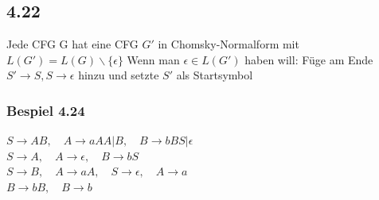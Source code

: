 \documentclass[11pt]{article}
\begin{document}
\subsection{4.22}
\label{sec:org444fd62}
Jede CFG G hat eine CFG \(G'\) in Chomsky-Normalform mit \(L(G') = L(G) \backslash \{\epsilon\}\)
Wenn man \(\epsilon \in L(G')\) haben will: Füge am Ende \(S' \rightarrow S, S\rightarrow \epsilon\) hinzu und setzte \(S'\) als Startsymbol

\subsubsection{Bespiel 4.24}
\label{sec:org7d94006}
\(S \rightarrow AB,\quad A \rightarrow aAA|B,\quad B \rightarrow bBS|\epsilon\) \\
\(S \rightarrow A,\quad A \rightarrow \epsilon,\quad B \rightarrow bS\) \\
\(S \rightarrow B,\quad A \rightarrow aA,\quad S \rightarrow \epsilon,\quad A \rightarrow a\) \\
\(B \rightarrow bB,\quad B \rightarrow b\)
\end{document}
